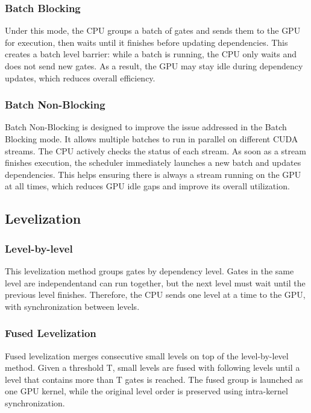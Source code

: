 \documentclass[sigconf,screen,nonacm]{acmart}
\begin{document}
        \subsubsection{Batch Blocking}
        Under this mode, the CPU groups a batch of gates and sends them to the GPU for execution, then waits until it finishes before updating dependencies. This creates a batch level barrier: while a batch is running, the CPU only waits and does not send new gates. As a result, the GPU may stay idle during dependency updates, which reduces overall efficiency. 
        \subsubsection{Batch Non-Blocking}
        Batch Non-Blocking \cite{10.1007/978-3-031-69583-4_11} is designed to improve the issue addressed in the Batch Blocking mode. It allows multiple batches to run in parallel on different CUDA streams. The CPU actively checks the status of each stream. As soon as a stream finishes execution, the scheduler immediately launches a new batch and updates dependencies. This helps ensuring there is always a stream running on the GPU at all times, which reduces GPU idle gaps and improve its overall utilization. 
    \subsection{Levelization}
        \subsubsection{Level-by-level}
        This levelization method \cite{lsim} groups gates by dependency level. Gates in the same level are independentand can run together, but the next level must wait until the previous level finishes. Therefore, the CPU sends one level at a time to the GPU, with synchronization between levels. 
        \subsubsection{Fused Levelization}
        Fused levelization \cite{10.1007/978-3-031-99872-0_14} merges consecutive small levels on top of the level-by-level method. Given a threshold T, small levels are fused with following levels until a level that contains more than T gates is reached. The fused group is launched as one GPU kernel, while the original level order is preserved using intra-kernel synchronization.
\end{document}
